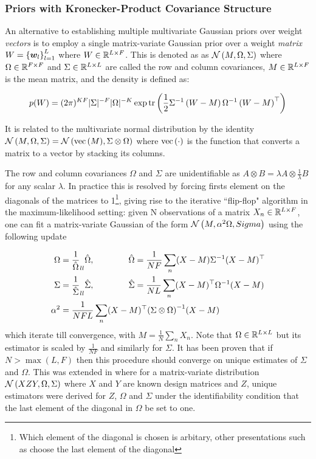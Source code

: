 

\subsubsection{Priors with Kronecker-Product Covariance Structure}
An alternative to establishing multiple multivariate Gaussian priors over weight \emph{vectors} is to employ a single matrix-variate Gaussian\cite{Gupta1999} prior over a weight \emph{matrix} $W = \left\{\bm w_l\right\}_{l=1}^L$ where $W \in { \mathbb{R}^{L \times F} }$. This is denoted as as $\mathcal{N} \left(M, \Omega, \Sigma\right)$ where $\Omega \in { \mathbb{R}^{F \times F} }$ and $\Sigma \in { \mathbb{R}^{L \times L} }$ are called the row and column covariances, $M \in { \mathbb{R}^{L \times F} }$ is the mean matrix, and the density is defined as:

\begin{equation}
p(W) = (2\pi)^{KF}|\Sigma|^{-F}|\Omega|^{-K} \exp\text{tr} \left( {\frac{1}{2} {\Sigma}^{-1}\left(W - M\right) {\Omega}^{-1} \left(W - M \right)^\top} \right)
\end{equation}

It is related to the multivariate normal distribution by the identity $\mathcal{N} \left(M, \Omega, \Sigma\right) = \mathcal{N} \left( {\text{vec}\left(M\right)}, {\Sigma \otimes \Omega} \right)$ where $\text{vec}\left(\cdot\right)$ is the function that converts a matrix to a vector by stacking its columns. 

The row and column covariances $\Omega$ and $\Sigma$ are unidentifiable as $A \otimes B = \lambda A \otimes \frac{1}{\lambda}B$ for any scalar $\lambda$. In practice this is resolved by forcing firsts element on the diagonals of the matrices to 1\footnote{Which element of the diagonal is chosen is arbitary, other presentations such as \cite{Srivastava2009} choose the last element of the diagonal}, giving rise to the iterative ``flip-flop" algorithm in the maximum-likelihood setting: given N observations of a matrix $X_n \in { \mathbb{R}^{L \times F} }$, one can fit a matrix-variate Gaussian of the form $\mathcal{N} \left(M, \alpha^2 \Omega, Sigma\right)$ using the following update

\begin{align}
\Omega & = \frac{1}{\hat{\Omega}}_{ll} \hat{\Omega}, \qquad\qquad\hat{\Omega} = \frac{1}{N F} \sum_n (X - M) {\Sigma}^{-1} (X - M)^\top \\
\Sigma & = \frac{1}{\hat{\Sigma}}_{ll} \hat{\Sigma}, \qquad\qquad\hat{\Sigma} = \frac{1}{N L} \sum_n (X - M)^\top {\Omega}^{-1} (X - M) \\
\alpha^2 & = \frac{1}{NFL} \sum_n (X - M)^\top{\left( \Sigma \otimes \Omega \right)}^{-1}(X - M)
\end{align}
which iterate till convergence, with $M=\frac{1}{N} \sum_n X_n$. Note that $\Omega \in { \mathbb{R}^{L \times L} }$ but its estimator is scaled by $\frac{1}{N F}$ and similarly for $\Sigma$. It has been proven that if $N > \max(L, F)$ then this procedure should converge on unique estimates of $\Sigma$ and $\Omega$\cite{Srivastava2009}. This was extended in \cite{Srivastava2009a} where for a matrix-variate distribution $\mathcal{N} \left(XZY, \Omega, \Sigma\right)$ where $X$ and $Y$ are known design matrices and $Z$, unique estimators were derived for $Z$, $\Omega$ and $\Sigma$ under the identifiability condition that the last element of the diagonal in $\Omega$ be set to one.

